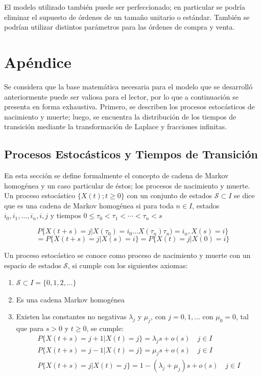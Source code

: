 \documentclass[11pt]{article}
\numberwithin{equation}{section} %
\begin{document}
El modelo utilizado también puede ser perfeccionado; en particular se podría eliminar el supuesto de órdenes de un tamaño unitario o estándar. También se podrían utilizar distintos parámetros para las órdenes de compra y venta.


\clearpage

\appendix
\section{Apéndice} \label{App:AppendixA}

Se considera que la base matemática necesaria para el modelo que se desarrolló anteriormente puede ser valiosa para el lector, por lo que a continuación se presenta en forma exhaustiva. Primero, se describen los procesos estocásticos de nacimiento y muerte; luego, se encuentra la distribución de los tiempos de transición mediante la transformación de Laplace y fracciones infinitas.\\

\subsection{Procesos Estocásticos y Tiempos de Transición}

En esta sección se define formalmente el concepto de cadena de Markov homogénea y un caso particular de éstos; los procesos de nacimiento y muerte. Un proceso estocástico $\{X(t);t\geq 0\}$ con un conjunto de estados $\mathcal{S} \subset I$ se dice que es una cadena de Markov homogénea si para toda $n \in I$, estados $i_{0},i_{1},\ldots,i_{n},i,j$ y tiempos $0\leq\tau_0<\tau_1<\cdots<\tau_n<s$

\[
P\{X(t+s)=j|X(\tau_0)=i_0\ldots X(\tau_n)\tau_n)=i_n,X(s)=i\}
\]
\begin{equation}
= P\{X(t+s)=j|X(s)=i\} = P\{X(t)=j|X(0)=i\}
\end{equation}

Un proceso estocástico se conoce como proceso de nacimiento y muerte con un espacio de estados $\mathcal{S}$, si cumple con los siguientes axiomas:

\begin{enumerate}
  \item $\mathcal{S} \subset I = \{ 0,1,2,\ldots\}$
  \item Es una cadena Markov homogénea
  \item Existen las constantes no negativas $\lambda_j$ y $\mu_j$, con $j=0,1,\ldots$ con $\mu_0=0$, tal que para $s>0$ y $t\geq 0$, se cumple:
\begin{subequations}
\begin{eqnarray}
P\{X(t+s)=j+1|X(t)=j\} = \lambda_j s + o(s)\quad j \in I \\
P\{X(t+s)=j-1|X(t)=j\} = \mu_js + o(s)\quad j \in I \\
P\{X(t+s)=j|X(t)=j\} = 1-(\lambda_j+\mu_j)s + o(s)\quad j \in I 
\end{eqnarray}
\end{subequations}
\end{enumerate}
\end{document}
